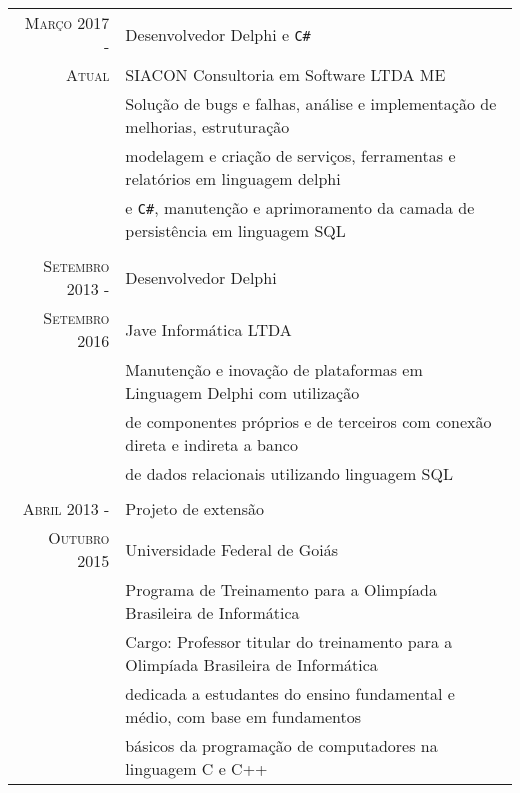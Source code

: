 \documentclass[a4paper,10pt]{article}
\begin{document}
\begin{tabular}{rl}	
\textsc{Março} 2017 - & Desenvolvedor Delphi e \texttt{C\#} \\
\textsc{Atual}             & SIACON Consultoria em Software LTDA ME \\ 
			    & Solução de bugs e falhas, análise e implementação de melhorias, estruturação\\
                                    & modelagem e criação de serviços, ferramentas e relatórios em linguagem delphi \\
                                    & e \texttt{C\#}, manutenção e aprimoramento da camada de persistência em linguagem SQL \\

& \\ 

\textsc{Setembro} 2013 - & Desenvolvedor Delphi \\
\textsc{Setembro} 2016   & Jave Informática LTDA \\ 
			          & Manutenção e inovação de plataformas em Linguagem Delphi com utilização \\
                                          & de componentes próprios e de terceiros com conexão direta e indireta a banco\\
                                          & de dados relacionais utilizando linguagem SQL \\

& \\ 

\textsc{Abril} 2013 - & Projeto de extensão \\
\textsc{Outubro} 2015 & Universidade Federal de Goiás \\
 			      & Programa de Treinamento para a Olimpíada Brasileira de Informática \\
                                      & Cargo: Professor titular do treinamento para a Olimpíada Brasileira de Informática \\
                                      & dedicada a estudantes do ensino fundamental e médio, com base em fundamentos \\
                     		      & básicos da programação de computadores na linguagem C e C++ \\

\end{tabular}

\end{document}
